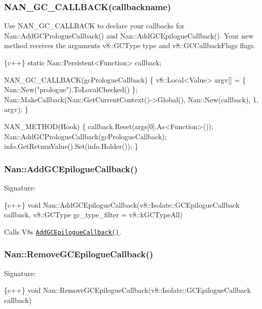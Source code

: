 \label{_api_nan_gc_callback}%
 \subsubsection*{N\+A\+N\+\_\+\+G\+C\+\_\+\+C\+A\+L\+L\+B\+A\+C\+K(callbackname)}

Use {\ttfamily N\+A\+N\+\_\+\+G\+C\+\_\+\+C\+A\+L\+L\+B\+A\+CK} to declare your callbacks for {\ttfamily Nan\+::\+Add\+G\+C\+Prologue\+Callback()} and {\ttfamily Nan\+::\+Add\+G\+C\+Epilogue\+Callback()}. Your new method receives the arguments {\ttfamily v8\+::\+G\+C\+Type type} and {\ttfamily v8\+::\+G\+C\+Callback\+Flags flags}.


\begin{DoxyCode}
\{c++\}
static Nan::Persistent<Function> callback;

NAN\_GC\_CALLBACK(gcPrologueCallback) \{
  v8::Local<Value> argv[] = \{ Nan::New("prologue").ToLocalChecked() \};
  Nan::MakeCallback(Nan::GetCurrentContext()->Global(), Nan::New(callback), 1, argv);
\}

NAN\_METHOD(Hook) \{
  callback.Reset(args[0].As<Function>());
  Nan::AddGCPrologueCallback(gcPrologueCallback);
  info.GetReturnValue().Set(info.Holder());
\}
\end{DoxyCode}


\label{_api_nan_add_gc_epilogue_callback}%
 \subsubsection*{Nan\+::\+Add\+G\+C\+Epilogue\+Callback()}

Signature\+:


\begin{DoxyCode}
\{c++\}
void Nan::AddGCEpilogueCallback(v8::Isolate::GCEpilogueCallback callback, v8::GCType gc\_type\_filter =
       v8::kGCTypeAll)
\end{DoxyCode}


Calls V8\textquotesingle{}s \href{https://v8docs.nodesource.com/io.js-3.0/d5/dda/classv8_1_1_isolate.html#a90d1860babc76059c62514b422f56960}{\tt {\ttfamily Add\+G\+C\+Epilogue\+Callback()}}.

\label{_api_nan_remove_gc_epilogue_callback}%
 \subsubsection*{Nan\+::\+Remove\+G\+C\+Epilogue\+Callback()}

Signature\+:


\begin{DoxyCode}
\{c++\}
void Nan::RemoveGCEpilogueCallback(v8::Isolate::GCEpilogueCallback callback)
\end{DoxyCode}



